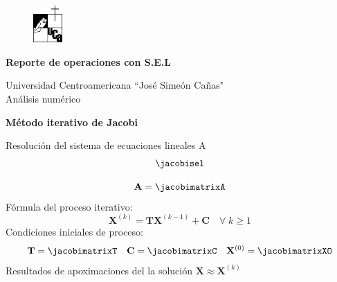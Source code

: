 \documentclass{article}
\newenvironment{fmpage}[1]
{\begin{lrbox}{\fmbox}\begin{minipage}{#1}}
{\end{minipage}\end{lrbox}\fbox{\usebox{\fmbox}}}
\begin{document}
\begin{center}
\begin{minipage}{\linewidth}
\vspace{-0.5cm}
\begin{fmpage}{\linewidth}
\vspace{0.5cm}
\begin{figure}
\vspace{-1.2cm}

\centering
\includegraphics[width=0.1\textwidth]{logo}
\end{figure}
\LARGE{\textbf {Reporte de operaciones con S.E.L}}

\vspace{0.5cm}
\large{Universidad Centroamericana ``Jos\'e Sime\'on Ca\~nas"} \\
\large{An\'alisis num\'erico}
\vspace{0.5cm}
\end{fmpage}
\vspace{1cm}
\end{minipage}
\end{center}



\begin{center}
\large\textbf{{M\'etodo iterativo de Jacobi}}
\end{center}
Resoluci\'on del sistema de ecuaciones lineales A
\[
\jacobisel
\]

\[
\mathbf{A}=
\jacobimatrixA
\]
F\'ormula del proceso iterativo:
\[
\mathbf{X}^{(k)} = \mathbf{TX}^{(k-1)} + \mathbf{C} \quad \forall \; k \geq 1
\]
Condiciones iniciales de proceso:
\[
\mathbf{T}=
\jacobimatrixT
\quad
\mathbf{C}=
\jacobimatrixC
\quad
\mathbf{X}^{(0)}=
\jacobimatrixXO
\]
Resultados de apoximaciones del la soluci\'on $\mathbf{X} \approx \mathbf{X}^{(k)}$
\begin{center}
\jacobitables
\end{center}
\end{document}

